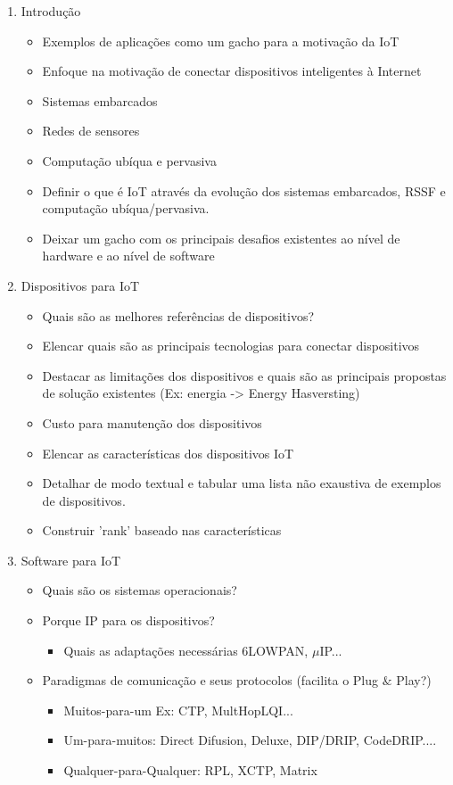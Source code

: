 \documentclass{SBCbookchapter}
\begin{document}
\begin{enumerate}
  \item Introdução
    \begin{itemize}
      \item Exemplos de aplicações como um gacho para a motivação da IoT
      \item Enfoque na motivação de conectar dispositivos inteligentes à 
Internet
      \item Sistemas embarcados
      \item Redes de sensores
      \item Computação ubíqua e pervasiva
      \item Definir o que é IoT através da evolução dos sistemas embarcados, 
RSSF e computação ubíqua/pervasiva.
      \item Deixar um gacho com os principais desafios existentes ao nível de 
hardware e ao nível de software
    \end{itemize}

  \item Dispositivos para IoT
    \begin{itemize}
      \item Quais são as melhores referências de dispositivos?
      \item Elencar quais são as principais tecnologias para conectar 
dispositivos
      \item Destacar as limitações dos dispositivos e quais são as principais 
propostas de solução existentes (Ex: energia -> Energy Hasversting)
      \item Custo para manutenção dos dispositivos
      \item Elencar as características dos dispositivos IoT
      \item Detalhar de modo textual e tabular uma lista não exaustiva de 
exemplos de dispositivos.
      \item Construir 'rank' baseado nas características
    \end{itemize}

  \item Software para IoT
    \begin{itemize}
      \item Quais são os sistemas operacionais?
      \item Porque IP para os dispositivos?
	\begin{itemize}
	  \item Quais as adaptações necessárias 6LOWPAN, $\mu$IP...
	\end{itemize}
      \item Paradigmas de comunicação e seus protocolos (facilita o Plug $\& 
$ Play?)
      \begin{itemize}
       \item Muitos-para-um Ex: CTP, MultHopLQI...
       \item Um-para-muitos: Direct Difusion, Deluxe, DIP/DRIP, CodeDRIP....
       \item Qualquer-para-Qualquer: RPL, XCTP, Matrix
      \end{itemize}
      

\end{itemize}
\end{enumerate}
\end{document}
